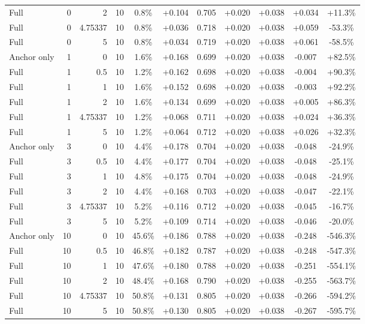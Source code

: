 \begin{table}[htbp]
\begin{tabular}{lrrrccccccc}
Full & 0 & 2 & 10 & 0.8\% & +0.104 & 0.705 & +0.020 & +0.038 & +0.034 & +11.3\% \\
Full & 0 & 4.75337 & 10 & 0.8\% & +0.036 & 0.718 & +0.020 & +0.038 & +0.059 & -53.3\% \\
Full & 0 & 5 & 10 & 0.8\% & +0.034 & 0.719 & +0.020 & +0.038 & +0.061 & -58.5\% \\
Anchor only & 1 & 0 & 10 & 1.6\% & +0.168 & 0.699 & +0.020 & +0.038 & -0.007 & +82.5\% \\
Full & 1 & 0.5 & 10 & 1.2\% & +0.162 & 0.698 & +0.020 & +0.038 & -0.004 & +90.3\% \\
Full & 1 & 1 & 10 & 1.6\% & +0.152 & 0.698 & +0.020 & +0.038 & -0.003 & +92.2\% \\
Full & 1 & 2 & 10 & 1.6\% & +0.134 & 0.699 & +0.020 & +0.038 & +0.005 & +86.3\% \\
Full & 1 & 4.75337 & 10 & 1.2\% & +0.068 & 0.711 & +0.020 & +0.038 & +0.024 & +36.3\% \\
Full & 1 & 5 & 10 & 1.2\% & +0.064 & 0.712 & +0.020 & +0.038 & +0.026 & +32.3\% \\
Anchor only & 3 & 0 & 10 & 4.4\% & +0.178 & 0.704 & +0.020 & +0.038 & -0.048 & -24.9\% \\
Full & 3 & 0.5 & 10 & 4.4\% & +0.177 & 0.704 & +0.020 & +0.038 & -0.048 & -25.1\% \\
Full & 3 & 1 & 10 & 4.8\% & +0.175 & 0.704 & +0.020 & +0.038 & -0.048 & -24.9\% \\
Full & 3 & 2 & 10 & 4.4\% & +0.168 & 0.703 & +0.020 & +0.038 & -0.047 & -22.1\% \\
Full & 3 & 4.75337 & 10 & 5.2\% & +0.116 & 0.712 & +0.020 & +0.038 & -0.045 & -16.7\% \\
Full & 3 & 5 & 10 & 5.2\% & +0.109 & 0.714 & +0.020 & +0.038 & -0.046 & -20.0\% \\
Anchor only & 10 & 0 & 10 & 45.6\% & +0.186 & 0.788 & +0.020 & +0.038 & -0.248 & -546.3\% \\
Full & 10 & 0.5 & 10 & 46.8\% & +0.182 & 0.787 & +0.020 & +0.038 & -0.248 & -547.3\% \\
Full & 10 & 1 & 10 & 47.6\% & +0.180 & 0.788 & +0.020 & +0.038 & -0.251 & -554.1\% \\
Full & 10 & 2 & 10 & 48.4\% & +0.168 & 0.790 & +0.020 & +0.038 & -0.255 & -563.7\% \\
Full & 10 & 4.75337 & 10 & 50.8\% & +0.131 & 0.805 & +0.020 & +0.038 & -0.266 & -594.2\% \\
Full & 10 & 5 & 10 & 50.8\% & +0.130 & 0.805 & +0.020 & +0.038 & -0.267 & -595.7\% \\

\end{tabular}
\end{table}
